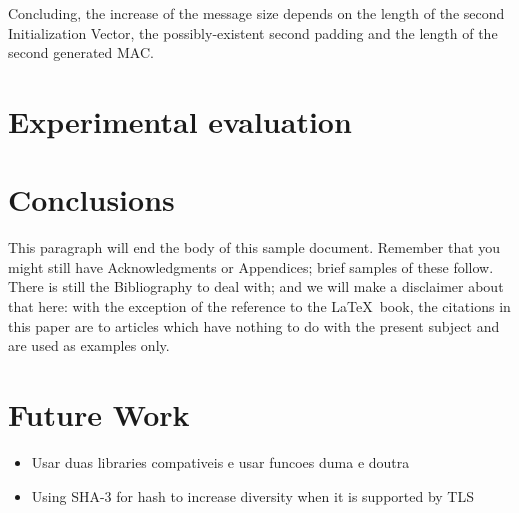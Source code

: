 \documentclass{sig-alternate-05-2015}
\begin{document}
Concluding, the increase of the message size depends on the length of the second Initialization Vector, the possibly-existent second padding and the length of the second generated MAC.

\section{Experimental evaluation}



\section{Conclusions}
This paragraph will end the body of this sample document.
Remember that you might still have Acknowledgments or
Appendices; brief samples of these
follow.  There is still the Bibliography to deal with; and
we will make a disclaimer about that here: with the exception
of the reference to the \LaTeX\ book, the citations in
this paper are to articles which have nothing to
do with the present subject and are used as
examples only.


\section{Future Work}

\begin{itemize}
\item Usar duas libraries compativeis e usar funcoes duma e doutra
\item Using SHA-3 for hash to increase diversity when it is supported by TLS
\end{itemize}
\end{document}
